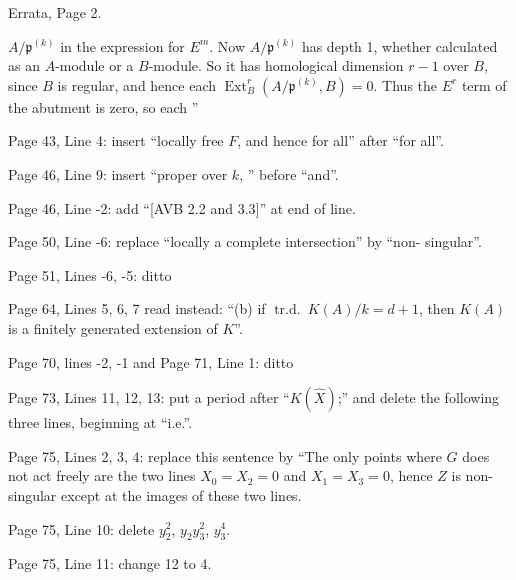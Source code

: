 Errata, Page 2.

$A/\mathfrak p^{(k)}$ in the expression for $E^m$. Now $A/\mathfrak p^{(k)}$ has depth 1, whether calculated as an $A$-module or a $B$-module. So it has homological dimension $r-1$ over $B$, since $B$ is regular, and hence each $\operatorname{Ext}_B^r(A/\mathfrak p^{(k)},B)=0$. Thus the $E^r$ term of the abutment is zero, so each ''

Page 43, Line 4: insert ``locally free $F$, and hence for all'' after ``for all''.

Page 46, Line 9: insert ``proper over $k$, '' before ``and''.

Page 46, Line -2: add ``[AVB 2.2 and 3.3]'' at end of line.

Page 50, Line -6: replace ``locally a complete intersection'' by ``non-
singular''.

Page 51, Lines -6, -5: ditto

Page 64, Lines 5, 6, 7 read instead: ``(b) if $\operatorname{tr.d.}\ K(A)/k=d+1$, then $K(A)$ is a finitely generated extension of $K$''.

Page 70, lines -2, -1 and Page 71, Line 1: ditto

Page 73, Lines 11, 12, 13: put a period after ``$K(\hat X)$;'' and delete the following three lines, beginning at ``i.e.''.

Page 75, Lines 2, 3, 4: replace this sentence by ``The only points where $G$ does not act freely are the two lines $X_0=X_2=0$ and $X_1=X_3=0$, hence $Z$ is non-singular except at the images of these two lines.

Page 75, Line 10: delete $y_2^2$, $y_2y_3^2$, $y_3^4$.

Page 75, Line 11: change 12 to 4.
